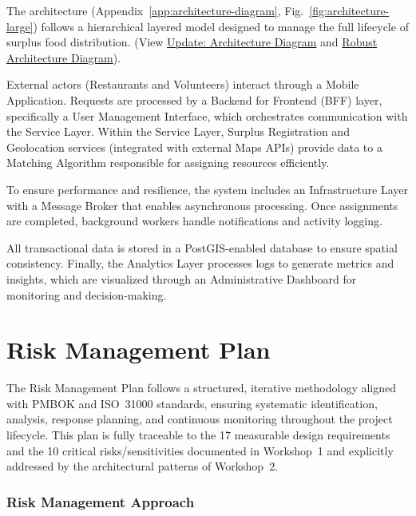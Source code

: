 \documentclass[9pt,conference]{IEEEtran}
\begin{document}
The architecture (Appendix~\ref{app:architecture-diagram}, Fig.~\ref{fig:architecture-large}) follows a hierarchical layered model designed to manage the full lifecycle of surplus food distribution. (View \href{https://github.com/Cristian7B/SystemAnalysisCourse/blob/main/Workshop_3_Management/Diagrams/system-architecture-diagram-updated.png}{Update: Architecture Diagram} and \href{https://github.com/Cristian7B/SystemAnalysisCourse/blob/main/Workshop_3_Management/Diagrams/Robust-Architecture.png}{Robust Architecture Diagram}).

External actors (Restaurants and Volunteers) interact through a Mobile Application. Requests are processed by a Backend for Frontend (BFF) layer, specifically a User Management Interface, which orchestrates communication with the Service Layer. Within the Service Layer, Surplus Registration and Geolocation services (integrated with external Maps APIs) provide data to a Matching Algorithm responsible for assigning resources efficiently.

To ensure performance and resilience, the system includes an Infrastructure Layer with a Message Broker that enables asynchronous processing. Once assignments are completed, background workers handle notifications and activity logging.

All transactional data is stored in a PostGIS-enabled database to ensure spatial consistency. Finally, the Analytics Layer processes logs to generate metrics and insights, which are visualized through an Administrative Dashboard for monitoring and decision-making.

\section{Risk Management Plan}

The Risk Management Plan follows a structured, iterative methodology aligned with PMBOK and ISO~31000 standards, ensuring systematic identification, analysis, response planning, and continuous monitoring throughout the project lifecycle. This plan is fully traceable to the 17 measurable design requirements and the 10 critical risks/sensitivities documented in Workshop~1 and explicitly addressed by the architectural patterns of Workshop~2.

\subsubsection{Risk Management Approach}
\end{document}
